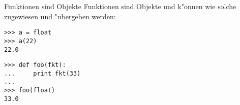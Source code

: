 \begin{frame}[fragile]{Funktionen sind Objekte}
Funktionen sind Objekte und k"onnen wie solche zugewiesen und "ubergeben werden:
\begin{lstlisting}[style=Shell]
>>> a = float
>>> a(22)
22.0
\end{lstlisting}
\begin{lstlisting}[style=Shell]
>>> def foo(fkt):
...     print fkt(33)
...
>>> foo(float)
33.0
\end{lstlisting}
\end{frame}

